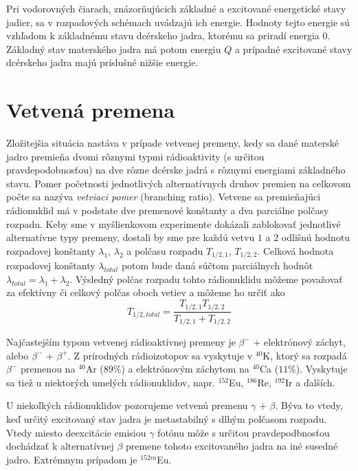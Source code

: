 \documentclass[../../main.tex]{subfiles}
\begin{document}
Pri vodorovných čiarach, znázorňujúcich základné a excitované energetické stavy jadier, sa v rozpadových schémach uvádzajú ich energie. Hodnoty tejto energie sú vzhľadom k základnému stavu dcérskeho jadra, ktorému sa priradí energia $0$. Základný stav materského jadra má potom energiu $Q$ a prípadné excitované stavy dcérskeho jadra majú príslušné nižšie energie.

\section{Vetvená premena}

Zložitejšia situácia nastáva v prípade vetvenej premeny, kedy sa dané materské jadro premieňa dvomi rôznymi typmi rádioaktivity (s určitou pravdepodobnosťou) na dve rôzne dcérske jadrá s rôznymi energiami základného stavu. Pomer početnosti jednotlivých alternatívnych druhov premien na celkovom počte sa nazýva \textit{vetviaci pomer} (branching ratio). Vetvene sa premieňajúci rádionuklid má v podstate dve premenové konštanty a dva parciálne polčasy rozpadu. Keby sme v myšlienkovom experimente dokázali zablokovať jednotlivé alternatívne typy premeny, dostali by sme pre každú vetvu $1$ a $2$ odlišnú hodnotu rozpadovej konštanty $\lambda_1$, $\lambda_2$ a polčasu rozpadu $T_{1/2,1}$, $T_{1/2,2}$. Celková hodnota rozpadovej konštanty $\lambda_{total}$ potom bude daná súčtom parciálnych hodnôt $\lambda_{total}=\lambda_1+\lambda_2$. Výsledný polčas rozpadu tohto rádionuklidu môžeme považovať za efektívny či celkový polčas oboch vetiev a môžeme ho určiť ako
\begin{equation}
T_{1/2,total}=\dfrac{T_{1/2,1}T_{1/2,2}}{T_{1/2,1}+T_{1/2,2}}
\end{equation} 

Najčastejším typom vetvenej rádioaktívnej premeny je $\beta^-$ + elektrónový záchyt, alebo $\beta^-$ + $\beta^+$. Z prírodných rádioizotopov sa vyskytuje v $^{40}$K, ktorý sa rozpadá $\beta^-$ premenou na $^{40}$Ar ($89\%$) a elektrónovým záchytom na $^{40}$Ca ($11\%$). Vyskytuje sa tiež u niektorých umelých rádionuklidov, napr. $^{152}$Eu, $^{186}$Re, $^{192}$Ir a ďalších.

U niekoľkých rádionuklidov pozorujeme vetvenú premenu $\gamma$ + $\beta$. Býva to vtedy, keď určitý excitovaný stav jadra je metastabilný s dlhým polčasom rozpadu. Vtedy miesto deexcitácie emisiou $\gamma$ fotónu môže s určitou pravdepodbnosťou dochádzať k alternatívnej $\beta$ premene tohoto excitovaného jadra na iné susedné jadro. Extrémnym prípadom je $^{152m}$Eu.
\end{document}
